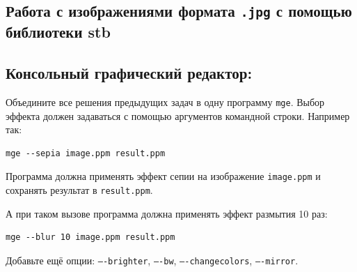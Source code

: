 \documentclass{article}
\begin{document}
\newpage
\subsection*{Работа с изображениями формата \texttt{.jpg} с помощью библиотеки stb}

\subsection{Консольный графический редактор:} Объедините все решения предыдущих задач в одну программу \texttt{mge}. Выбор эффекта должен задаваться с помощью аргументов командной строки. Например так:
\begin{verbatim}
mge --sepia image.ppm result.ppm
\end{verbatim}
Программа должна применять эффект сепии на изображение \texttt{image.ppm} и сохранять результат в \texttt{result.ppm}.

А при таком вызове программа должна применять эффект размытия 10 раз:
\begin{verbatim}
mge --blur 10 image.ppm result.ppm
\end{verbatim}
Добавьте ещё опции: \texttt{----brighter}, \texttt{----bw}, \texttt{----changecolors}, \texttt{----mirror}.
\end{document}
